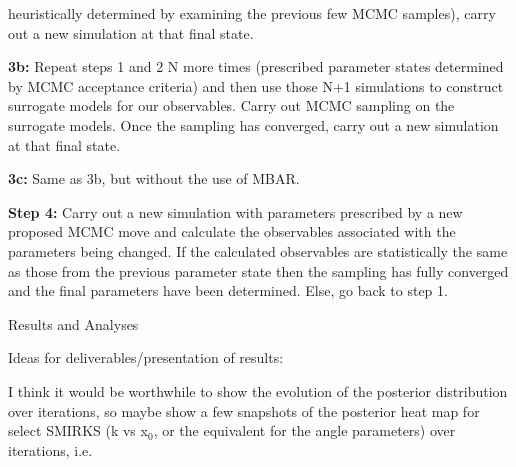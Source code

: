 \documentclass{report}
\begin{document}
\begin{outline}
\begin{outline}
\begin{outline}
\begin{outline}
\begin{outline}
\begin{outline}
{                  heuristically determined by examining the previous few MCMC samples), carry out a new simulation at that final state.}
            \item{\textbf{3b:} Repeat steps 1 and 2 N more times (prescribed parameter states determined by MCMC acceptance criteria) and then use those N+1
                  simulations to construct surrogate models for our observables. Carry out MCMC sampling on the surrogate models. Once the sampling has 
                  converged, carry out a new simulation at that final state.}
            \item{\textbf{3c:} Same as 3b, but without the use of MBAR.}
          \end{outline} 
          \item{\textbf{Step 4:} Carry out a new simulation with parameters prescribed by a new proposed MCMC move and calculate the observables associated 
                with the parameters being changed. If the calculated observables are statistically the same as those from the previous parameter state then
                the sampling has fully converged and the final parameters have been determined. Else, go back to step 1.} 
        \end{outline} 
      \end{outline}   
    \end{outline}
  \end{outline}
      
  \item{Results and Analyses}
  \begin{outline}
    \item{Ideas for deliverables/presentation of results:}
    \begin{outline}
      \item{I think it would be worthwhile to show the evolution of the posterior distribution over iterations, so maybe show a few snapshots of 
                the posterior heat map for select SMIRKS (k vs x$_0$, or the equivalent for the angle parameters) over iterations, i.e.  
      \begin{figure}[h!]
      \centering
  

\end{figure}}
\end{outline}
\end{outline}
\end{outline}
\end{document}
